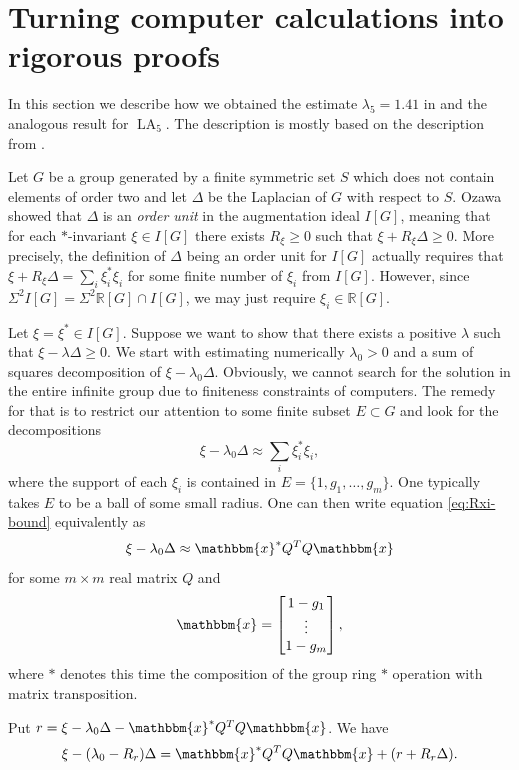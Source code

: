 \documentclass[12pt]{amsart}
\theoremstyle{definition}
\numberwithin{figure}{section}
\numberwithin{table}{section}
\numberwithin{equation}{section}
\newcommand{\OP}[1]{\operatorname{#1}}
\begin{document}
\section{Turning computer calculations into rigorous proofs}\label{s:computer-calc}
In this section we describe how we obtained the estimate $\lambda_5=1.41$ in  and the analogous result for $\OP{LA}_5$. The description is mostly based on the description from \cite{MR3794918}.

Let $G$ be a group generated by a finite symmetric set $S$ which does not contain elements of order two and let $\Delta$ be the Laplacian of $G$ with respect to $S$. Ozawa showed that $\Delta$ is an \emph{order unit} in the augmentation ideal $I[G]$, meaning that for each $*$-invariant $\xi\in I[G]$ there exists $R_{\xi}\geq 0$ such that $\xi+R_{\xi}\Delta\geq 0$. More precisely, the definition of $\Delta$ being an order unit for $I[G]$ actually requires that $\xi+R_{\xi}\Delta=\sum_i\xi_i^*\xi_i$ for some finite number of $\xi_i$ from $I[G]$. However, since $\Sigma^2I[G]=\Sigma^2\mathbb{R}[G]\cap I[G]$, we may just require $\xi_i\in\mathbb{R}[G]$. 

Let $\xi=\xi^*\in I[G]$. Suppose we want to show that there exists a positive $\lambda$ such that $\xi-\lambda\Delta\geq 0$. We start with estimating numerically $\lambda_0>0$ and a sum of squares decomposition of $\xi-\lambda_0\Delta$. Obviously, we cannot search for the solution in the entire infinite group due to finiteness constraints of computers. The remedy for that is to restrict our attention to some finite subset $E\subset G$ and look for the decompositions
\begin{equation}\label{eq:Rxi-bound}
    \xi-\lambda_0\Delta\approx \sum_i\xi_i^*\xi_i,
\end{equation}
where the support of each $\xi_i$ is contained in $E=\{1,g_1,\ldots,g_m\}$. One typically takes $E$ to be a ball of some small radius. One can then write equation \ref{eq:Rxi-bound} equivalently as
$$
\xi-\lambda_0\Delta\approx\mathbbm{x}^*Q^TQ\mathbbm{x}
$$
for some $m\times m$ real matrix $Q$ and 
$$
\mathbbm{x}=\begin{bmatrix}
    1-g_1\\
    \vdots\\
    1-g_m
\end{bmatrix},
$$
where $*$ denotes this time the composition of the group ring $*$ operation with matrix transposition. 

Put $r=\xi-\lambda_0\Delta-\mathbbm{x}^*Q^TQ\mathbbm{x}$. We have
$$
\xi-(\lambda_0-R_r)\Delta=\mathbbm{x}^*Q^TQ\mathbbm{x}+(r+R_r\Delta).
$$
\end{document}
